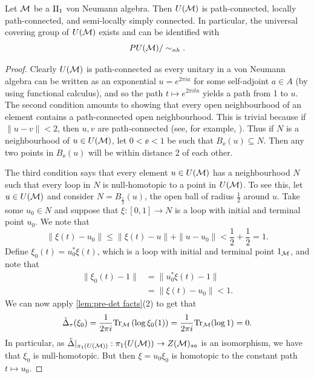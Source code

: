 \documentclass{amsart}
\begin{document}
\begin{lemma}
Let $\mathcal{M}$ be a $\text{II}_1$ von Neumann algebra. Then $U(\mathcal{M})$ is path-connected, locally path-connected, and semi-locally simply connected. In particular, the universal covering group of $U(\mathcal{M})$ exists and can be identified with
\begin{equation}
PU(\mathcal{M})/\sim_{nh}.
\end{equation}
\begin{proof}
Clearly $U(\mathcal{M})$ is path-connected as every unitary in a von Neumann algebra can be written as an exponential $u = e^{2\pi i a}$ for some self-adjoint $a \in A$ (by using functional calculus), and so the path $t \mapsto e^{2\pi i ta}$ yields a path from 1 to $u$.
The second condition amounts to showing that every open neighbourhood of an element contains a path-connected open neighbourhood.
This is trivial because if $\|u - v\| < 2$, then $u,v$ are path-connected (see, for example, \cite[Lemma 2.1.3(iii)]{RordamKBook}).
Thus if $N$ is a neighbourhood of $u \in U(\mathcal{M})$, let $0 < \ee < 1$ be such that $B_\ee(u) \subseteq N$.
Then any two points in $B_\ee(u)$ will be within distance 2 of each other.

The third condition says that every element $u \in U(\mathcal{M})$ has a neighbourhood $N$ such that every loop in $N$ is null-homotopic to a point in $U(\mathcal{M})$. To see this, let $u \in U(\mathcal{M})$ and consider $N = B_\frac{1}{2}(u)$, the open ball of radius $\frac{1}{2}$ around $u$. Take some $u_0 \in N$ and suppose that $\xi: [0,1] \to N$ is a loop with initial and terminal point $u_0$. 
We note that
\begin{equation}
\|\xi(t) - u_0\| \leq \|\xi(t) - u\| + \|u - u_0\| < \frac{1}{2} + \frac{1}{2} = 1.
\end{equation}
Define $\xi_0(t) = u_0^*\xi(t)$, which is a loop with initial and terminal point $1_{\mathcal{M}}$, and note that
\begin{equation}
\begin{split}
\|\xi_0(t) - 1\| &= \|u_0^*\xi(t) - 1\| \\
&= \|\xi(t) - u_0\| < 1.
\end{split}
\end{equation}
We can now apply \ref{lem:pre-det facts}(2) to get that
\begin{equation}
\tilde{\Delta}_\tau(\xi_0) = \frac{1}{2\pi i}\text{Tr}_{\mathcal{M}}\left(\log\xi_0(1)\right) = \frac{1}{2\pi i}\text{Tr}_{\mathcal{M}}(\log 1) = 0.
\end{equation}
In particular, as $\tilde{\Delta}|_{\pi_1(U(\mathcal{M}))}: \pi_1(U(\mathcal{M})) \to Z(\mathcal{M})_{sa}$ is an isomorphism, we have that $\xi_0$ is null-homotopic.
But then $\xi = u_0\xi_0$ is homotopic to the constant path $t \mapsto u_0$. 
\end{proof}
\end{lemma}
\end{document}
